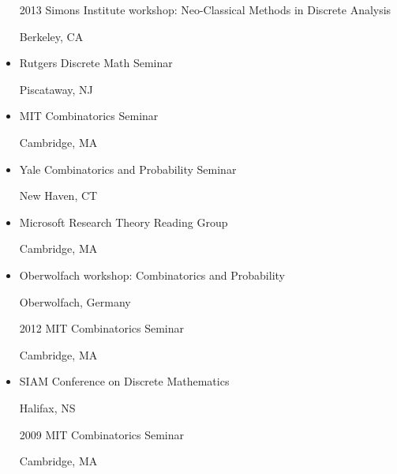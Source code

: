 \documentclass[11pt]{amsart}
\newcommand{\rightloc}[1]{\hfill {\raggedright #1}}
\begin{document}
\begin{itemize}[leftmargin=.4in,itemsep=5pt,topsep=0pt,label={}]
\item[2013] Simons Institute workshop: Neo-Classical Methods in
  Discrete Analysis \rightloc{Berkeley, CA}

\item Rutgers Discrete Math Seminar \rightloc{Piscataway,
    NJ}

\item MIT Combinatorics Seminar \rightloc{Cambridge, MA}

\item Yale Combinatorics and Probability Seminar
  \rightloc{New Haven, CT}

\item Microsoft Research Theory Reading Group \rightloc{Cambridge, MA}

\item Oberwolfach workshop: Combinatorics and Probability
  \rightloc{Oberwolfach, Germany}

\item[2012] MIT Combinatorics Seminar \rightloc{Cambridge, MA}   %
\item SIAM Conference on Discrete Mathematics
  \rightloc{Halifax, NS}   %
\item[2009] MIT Combinatorics Seminar \rightloc{Cambridge, MA}
\end{itemize}
\end{document}
